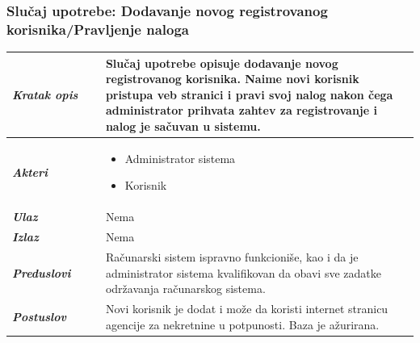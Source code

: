 \documentclass[20pt]{article}
\begin{document}
\subsubsection{\bfseries \large Slu\v{c}aj upotrebe: Dodavanje novog registrovanog korisnika/Pravljenje naloga}
\begin{center}
\begin{longtable}{p{0.23\linewidth} p{0.77\linewidth}}
\hline
 {\it \bfseries Kratak opis} & Slu\v {c}aj upotrebe opisuje dodavanje novog registrovanog korisnika. Naime novi korisnik pristupa veb stranici i pravi svoj nalog nakon \v {c}ega administrator prihvata zahtev za registrovanje i nalog je sa\v {c}uvan u sistemu.\\ 
 \hline
 {\it \bfseries Akteri} & \begin{itemize}
    \item Administrator sistema
    \item Korisnik
\end{itemize}\\
\hline

 {\it \bfseries Ulaz} & Nema\\
 \hline
 
 {\it \bfseries Izlaz} & Nema\\
 \hline
 
 {\it \bfseries Preduslovi} & Ra\v {c}unarski sistem ispravno funkcioni\v {s}e, kao i da je administrator sistema kvalifikovan da obavi sve zadatke odr\v {z}avanja ra\v {c}unarskog sistema.\\
 \hline
 
 {\it \bfseries Postuslov} & Novi korisnik je dodat i mo\v {z}e da koristi internet stranicu agencije za nekretnine u potpunosti. Baza je a\v {z}urirana.\\
 \hline


\end{longtable}
\end{center}
\end{document}
